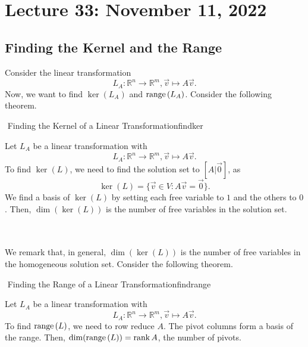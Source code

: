 \section{Lecture 33: November 11, 2022}

    \subsection{Finding the Kernel and the Range}

        Consider the linear transformation
        \begin{equation*}
            L_A:\mathbb{R}^n\to\mathbb{R}^m, \vec{v}\mapsto A\vec{v}.
        \end{equation*}
        Now, we want to find \(\ker(L_A)\) and \(\text{range\,}(L_A)\). Consider the following theorem.
        \begin{theorem}{\Stop\,\,Finding the Kernel of a Linear Transformation}{findker}

            Let \(L_A\) be a linear transformation with
            \begin{equation*}
                L_A:\mathbb{R}^n\to\mathbb{R}^m, \vec{v}\mapsto A\vec{v}.
            \end{equation*}
            To find \(\ker(L)\), we need to find the solution set to \([A|\vec{0}]\), as 
            \begin{equation*}
                \ker(L)=\{\vec{v}\in V: A\vec{v}=\vec{0}\}.
            \end{equation*}
            We find a basis of \(\ker(L)\) by setting each free variable to \(1\) and the others to \(0\). Then, \(\dim(\ker(L))\) is the number of free variables in the solution set.

        \end{theorem}
        \vphantom
        \\
        \\
        We remark that, in general, \(\dim(\ker(L))\) is the number of free variables in the homogeneous solution set. Consider the following theorem.
        \begin{theorem}{\Stop\,\,Finding the Range of a Linear Transformation}{findrange}

            Let \(L_A\) be a linear transformation with
            \begin{equation*}
                L_A:\mathbb{R}^n\to\mathbb{R}^m, \vec{v}\mapsto A\vec{v}.
            \end{equation*}
            To find \(\text{range\,}(L)\), we need to row reduce \(A\). The pivot columns form a basis of the range. Then, \(\dim(\text{range\,}(L))=\text{rank\,} A\), the number of pivots.

        \end{theorem}
